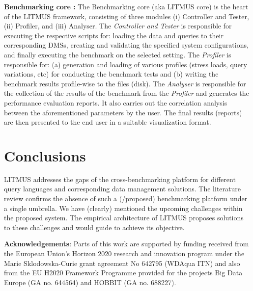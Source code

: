 \documentclass{llncs}
\begin{document}
        \textbf{Benchmarking core :} The Benchmarking core (aka LITMUS core) is the heart of the LITMUS framework, consisting of three modules (i) Controller and Tester, (ii) Profiler, and (iii) Analyser. The \textit{Controller and Tester} is responsible for executing the respective scripts for: loading the data and queries to their corresponding DMSs, creating and validating the specified system configurations, and finally executing the benchmark on the selected setting. The \textit{Profiler} is responsible for: (a) generation and loading of various profiles (stress loads, query variations, etc) for conducting the benchmark tests and (b) writing the benchmark results profile-wise to the files (disk). The \textit{Analyser} is responsible for the collection of the results of the benchmark from the \textit{Profiler} and generates the performance evaluation reports. It also carries out the correlation analysis between the aforementioned  parameters by the user. The final results (reports) are then presented to the end user in a suitable visualization format.
        
\section{Conclusions} 
LITMUS addresses the gaps of the cross-benchmarking platform for different query languages and corresponding data management solutions. 
The literature review confirms the absence of such a (/proposed)  benchmarking platform under a single umbrella. 
We have (clearly) mentioned the upcoming challenges within the proposed system.
The empirical architecture of LITMUS proposes solutions to these challenges and would guide to achieve its objective.

\textbf{Acknowledgements}: Parts of this work are supported by funding received from the European Union's Horizon 2020 research and innovation program under the Marie Sklodowska-Curie grant agreement No 642795 (WDAqua ITN) and also from the EU H2020 Framework Programme provided for the projects Big Data Europe (GA no. 644564) and HOBBIT (GA no. 688227).



\end{document}
